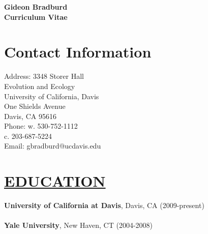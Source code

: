 \documentclass{res}
\begin{document}
 
\thispagestyle{empty} 

\begin{resume}



\begin{center}
\begin{large}
\textbf{Gideon Bradburd\\
\vspace{2mm}
Curriculum Vitae}
\end{large}
\end{center}
%
\vspace{-0.5cm}
\noindent\makebox[\linewidth]{\rule{18cm}{0.4pt}}
%
\section{\textbf{Contact Information}}
Address: \hspace{43mm} 3348 Storer Hall\\
\hspace*{57mm} Evolution and Ecology\\
\hspace*{57mm} University of California, Davis\\
\hspace*{57mm} One Shields Avenue\\
\vspace{10pt}\hspace*{57mm} Davis, CA 95616\\
Phone: \hspace{46mm}w. 530-752-1112\\
\vspace{10pt}\hspace*{57mm} c. 203-687-5224\\
Email: \hspace{45mm} gbradburd@ucdavis.edu\\
\noindent\makebox[\linewidth]{\rule{18cm}{0.4pt}}

\section{\underline{EDUCATION}}
\textbf{University of California at Davis}, Davis, CA	(2009-present)\\
\vspace{3mm}
\hspace{6mm}{Ph.D. Candidate, Population Biology Graduate Group}\\
\textbf{Yale University}, New Haven, CT	(2004-2008)\\
\vspace{3mm}
\hspace{6mm}{Class of 2008, Ecology and Evolutionary Biology, B.S., GPA: 3.62}
%

\end{resume}
\end{document}
